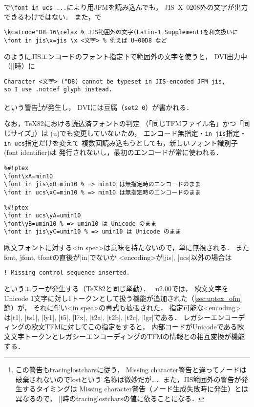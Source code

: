 \documentclass[a4paper,11pt,nomag,dvipdfmx]{jsarticle}
\begin{document}
\begin{dangerous}
  \pTeX で\verb|\font in ucs ...|により\upTeX 用JFMを読み込んでも，
  JIS~X~0208外の文字が出力できるわけではない．
  また，\upTeX で
\begin{verbatim}
\kcatcode"D8=16\relax % JIS範囲外の文字(Latin-1 Supplement)を和文扱いに
\font in jis\x=jis \x <文字> % 例えば U+00D8 など
\end{verbatim}
  のようにJISエンコードのフォント指定下で範囲外の文字を使うと，
  DVI出力中（|\shipout|時）に
\begin{verbatim}
Character <文字> ("D8) cannot be typeset in JIS-encoded JFM jis,
so I use .notdef glyph instead.
\end{verbatim}
  という警告\footnote{この警告も\.{tracinglostchars}に従う．
  Missing character警告と違ってノードは破棄されないのでlostという
  名称は微妙だが…．また，JIS範囲外の警告が発生するタイミングは
  Missing character警告（ノード生成失敗時に発生）とは異なるので，
  |\shipout|時の\.{tracinglostchars}の値に依ることになる．}が発生し，
  DVIには豆腐（\verb|set2 0|）が書かれる．
\end{dangerous}

\begin{dangerous}
  なお，\TeX82における読込済フォントの判定
  （「同じTFMファイル名」かつ「同じサイズ」）は
  (u)\pTeX でも変更していないため，
  エンコード無指定・\verb|in jis|指定・\verb|in ucs|指定だけを変えて
  複数回読み込もうとしても，新しいフォント識別子(font identifier)は
  発行されないし，最初のエンコードが常に使われる．
\begin{verbatim}
%#!ptex
\font\xA=min10
\font in jis\xB=min10 % => min10 は無指定時のエンコードのまま
\font in ucs\xC=min10 % => min10 は無指定時のエンコードのまま
\end{verbatim}
\begin{verbatim}
%#!ptex
\font in ucs\yA=umin10
\font\yB=umin10 % => umin10 は Unicode のまま
\font in jis\yC=umin10 % => umin10 は Unicode のまま
\end{verbatim}
\end{dangerous}

\begin{dangerous}
  欧文フォントに対する<in spec>は意味を持たないので，単に無視される．
  また\.{font}, \.{jfont}, \.{tfont}の直後が|in|でないか
  <encoding>が|jis|, |ucs|以外の場合は
\begin{verbatim}
! Missing control sequence inserted.
\end{verbatim}
  というエラーが発生する（\TeX82と同じ挙動）．
  \upTeX~u2.00では，
  欧文文字をUnicode 1文字に対し1トークンとして扱う機能が追加された（\ref{sec:uptex_ofm}節）が，
  それに伴い<in spec>の書式も拡張された．
  指定可能な<encoding>は|t1|, |ts1|, |ly1|, |t5|, |l7x|, |t2a|, |t2b|, |t2c|, |lgr|である．
  レガシーエンコーディングの欧文TFMに対してこの指定をすると，
  内部コードがUnicodeである欧文文字トークンとレガシーエンコーディングのTFMの情報との相互変換が機能する．
\end{dangerous}
\end{document}
